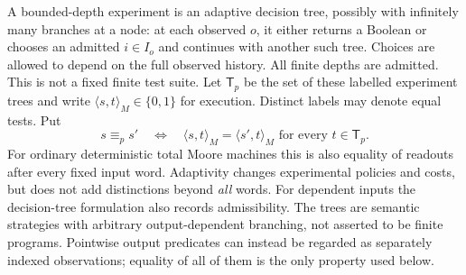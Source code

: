 \documentclass[11pt]{article}
\theoremstyle{definition}
\theoremstyle{remark}\newtheorem{remark}[theorem]{Remark}
\newcommand{\Tests}{\mathsf T}
\begin{document}
A bounded-depth experiment is an adaptive decision tree, possibly with
infinitely many branches at a node: at each observed
$o$, it either returns a Boolean or chooses an admitted $i\in I_o$ and
continues with another such tree. Choices are allowed to depend on the full
observed history. All finite depths are admitted. This is not a fixed finite
test suite. Let $\Tests_p$ be the set of these labelled experiment trees and
write $\langle s,t\rangle_M\in\{0,1\}$ for execution. Distinct labels may
denote equal tests. Put
\[
 s\equiv_p s'\quad\Longleftrightarrow\quad
 \langle s,t\rangle_M=\langle s',t\rangle_M
 \text{ for every }t\in\Tests_p.
\]
For ordinary deterministic total Moore machines this is also equality of
readouts after every fixed input word. Adaptivity changes experimental
policies and costs, but does not add distinctions beyond \emph{all} words.
For dependent inputs the decision-tree formulation also records admissibility.
The trees are semantic strategies with arbitrary output-dependent branching,
not asserted to be finite programs. Pointwise output predicates can instead
be regarded as separately indexed observations; equality of all of them is
the only property used below.
\end{document}
